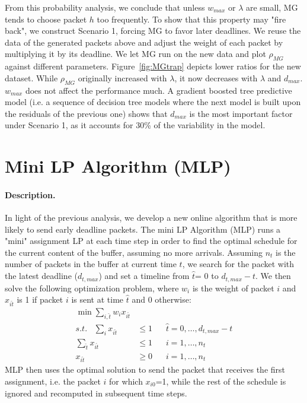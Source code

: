 \documentclass[oribibl]{llncs}
\begin{document}
\vspace{-24pt} 
From this probability analysis, we conclude that unless
$w_{max}$ or $\lambda$ are small, MG tends to choose packet $h$ too
frequently. To show that this property may "fire back", we construct
Scenario 1, forcing MG to favor later deadlines. We reuse the data of
the generated packets above and adjust the weight of each packet by
multiplying it by its deadline. We let MG run on the new data and plot
$\rho_{MG}$ against different parameters. Figure~\ref{fig:MGtrap}
depicts lower ratios for the new dataset. While $\rho_{MG}$ originally
increased with $\lambda$, it now decreases with $\lambda$ and
$d_{max}$. $w_{max}$ does not affect the performance much. A gradient
boosted tree predictive model (i.e. a sequence of decision tree models
where the next model is built upon the residuals of the previous one)
shows that $d_{max}$ is the most important factor under Scenario 1, as
it accounts for 30\% of the variability in the model.

\section {Mini LP Algorithm (MLP)}
\label{sec:MLP}
\paragraph{Description.} In light of the previous analysis, we 
develop a new online algorithm that is more likely to send early
deadline packets.  The mini LP Algorithm (MLP) runs a "mini"
assignment LP at each time step in order to find the optimal schedule
for the current content of the buffer, assuming no more
arrivals. Assuming $n_t$ is the number of packets in the buffer at current time $t$, we search for the packet with the latest deadline ($d_{t,max}$) and set a timeline from $\hat{t}$= 0 to $d_{t,max}-t$. We then solve the following optimization problem, where $w_i$ is the weight of packet $i$ and $x_{i\hat{t}}$ is 1 if packet $i$ is sent at time $\hat{t}$ and 0 otherwise:
{\small \begin{eqnarray*}
\min  \sum_{i,\hat{t}} w_i x_{i\hat{t}}  & & \\
s.t. \;\;\; 
\sum_{i} x_{i\hat{t}} &\le 1 &  \;\;\; \hat{t}= 0,\ldots, d_{t,max}-t\\
 \sum_{\hat{t}} x_{i\hat{t}} & \le 1  & \;\;\; i=1,\ldots, n_t \\
 x_{i\hat{t}} &\ge 0 & \;\;\; i=1,\ldots, n_t
\end{eqnarray*}}
MLP then uses the optimal solution to send the packet that receives the first assignment, i.e. the packet $i$ for which $x_{i0}$=1, while
the rest of the schedule is ignored and recomputed in subsequent time
steps.
\end{document}

